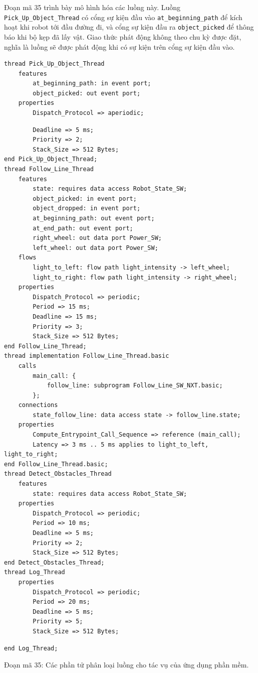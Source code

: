 Đoạn mã 35 trình bày mô hình hóa các luồng này. Luồng \texttt{Pick\_Up\_Object\_Thread} có cổng sự kiện đầu vào \texttt{at\_beginning\_path} để kích hoạt khi robot tới đầu đường đi, và cổng sự kiện đầu ra \texttt{object\_picked} để thông báo khi bộ kẹp đã lấy vật. Giao thức phát động không theo chu kỳ được đặt, nghĩa là luồng sẽ được phát động khi có sự kiện trên cổng sự kiện đầu vào.
\begin{verbatim}
thread Pick_Up_Object_Thread
    features
        at_beginning_path: in event port;
        object_picked: out event port;
    properties
        Dispatch_Protocol => aperiodic;
\end{verbatim}
\begin{verbatim}
        Deadline => 5 ms;
        Priority => 2;
        Stack_Size => 512 Bytes;
end Pick_Up_Object_Thread;
thread Follow_Line_Thread
    features
        state: requires data access Robot_State_SW;
        object_picked: in event port;
        object_dropped: in event port;
        at_beginning_path: out event port;
        at_end_path: out event port;
        right_wheel: out data port Power_SW;
        left_wheel: out data port Power_SW;
    flows
        light_to_left: flow path light_intensity -> left_wheel;
        light_to_right: flow path light_intensity -> right_wheel;
    properties
        Dispatch_Protocol => periodic;
        Period => 15 ms;
        Deadline => 15 ms;
        Priority => 3;
        Stack_Size => 512 Bytes;
end Follow_Line_Thread;
thread implementation Follow_Line_Thread.basic
    calls
        main_call: {
            follow_line: subprogram Follow_Line_SW_NXT.basic;
        };
    connections
        state_follow_line: data access state -> follow_line.state;
    properties
        Compute_Entrypoint_Call_Sequence => reference (main_call);
        Latency => 3 ms .. 5 ms applies to light_to_left, light_to_right;
end Follow_Line_Thread.basic;
thread Detect_Obstacles_Thread
    features
        state: requires data access Robot_State_SW;
    properties
        Dispatch_Protocol => periodic;
        Period => 10 ms;
        Deadline => 5 ms;
        Priority => 2;
        Stack_Size => 512 Bytes;
end Detect_Obstacles_Thread;
thread Log_Thread
    properties
        Dispatch_Protocol => periodic;
        Period => 20 ms;
        Deadline => 5 ms;
        Priority => 5;
        Stack_Size => 512 Bytes;
\end{verbatim}
\begin{verbatim}
end Log_Thread;
\end{verbatim}
\begin{center}\small Đoạn mã 35: Các phần tử phân loại luồng cho tác vụ của ứng dụng phần mềm.\end{center}


